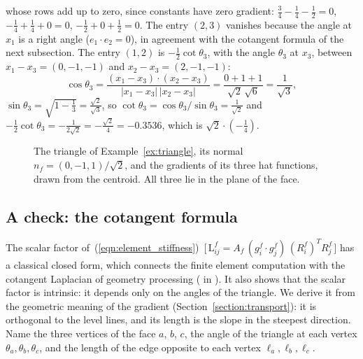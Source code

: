 \begin{example}
\begin{equation*}
\end{equation*}
whose rows add up to zero, since constants have zero gradient: $\frac34 - \frac14 - \frac12 = 0$, $-\frac14 + \frac14 + 0 = 0$, $-\frac12 + 0 + \frac12 = 0$. The entry $(2, 3)$ vanishes because the angle at $x_1$ is a right angle ($e_1\cdot e_2 = 0$), in agreement with the cotangent formula of the next subsection. The entry $(1, 2)$ is $-\frac12 \cot\theta_3$, with the angle $\theta_3$ at $x_3$, between $x_1 - x_3 = (0, -1, -1)$ and $x_2 - x_3 = (2, -1, -1)$:
\begin{equation*}
\cos\theta_3 = \frac{(x_1 - x_3) \cdot (x_2 - x_3)}{|x_1 - x_3|\, |x_2 - x_3|} = \frac{0 + 1 + 1}{\sqrt 2\, \sqrt 6} = \frac{1}{\sqrt 3},
\end{equation*}
$\sin\theta_3 = \sqrt{1 - \frac13} = \frac{\sqrt 2}{\sqrt 3}$, so $\cot\theta_3 = \cos\theta_3/\sin\theta_3 = \frac{1}{\sqrt 2}$ and $-\frac12 \cot\theta_3 = -\frac{1}{2\sqrt 2} = -\frac{\sqrt 2}{4} = -0.3536$, which is $\sqrt2\cdot(-\frac14)$.
\end{example}

\begin{figure}[t]
\centering
{}
\caption{The triangle of Example~\ref{ex:triangle}, its normal $n_f = (0, -1, 1)/\sqrt 2$, and the gradients of its three hat functions, drawn from the centroid. All three lie in the plane of the face.}
\label{fig:worked_triangle}
\end{figure}

\subsection{A check: the cotangent formula}

The scalar factor of~(\ref{eqn:element_stiffness})~[\,$\mathrm L^f_{ij} = A_f\,(g_i^f\cdot g_j^f)\,(R_i^f)^TR_j^f$\,] has a classical closed form, which connects the finite element computation with the cotangent Laplacian of geometry processing ( in ). It also shows that the scalar factor is intrinsic: it depends only on the angles of the triangle. We derive it from the geometric meaning of the gradient (Section~\ref{section:transport}): it is orthogonal to the level lines, and its length is the slope in the steepest direction. Name the three vertices of the face $a$, $b$, $c$, the angle of the triangle at each vertex $\theta_a, \theta_b, \theta_c$, and the length of the edge opposite to each vertex $\ell_a, \ell_b, \ell_c$.

